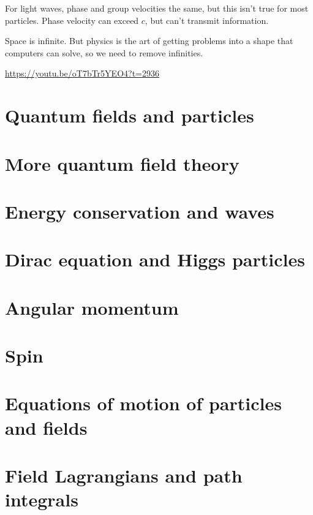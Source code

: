 \documentclass[]{article}
\begin{document}
For light waves, phase and group velocities the same, but this isn't true for most particles. Phase velocity can exceed $c$, but can't transmit information.

Space is infinite. But physics is the art of getting problems into a shape that computers can solve, so we need to remove infinities.

\url{https://youtu.be/oT7bTr5YEO4?t=2936}

\section{Quantum fields and particles}

\section{More quantum field theory}

\section{Energy conservation and waves}

\section{Dirac equation and Higgs particles}

\section{Angular momentum}

\section{Spin}

\section{Equations of motion of particles and fields}

\section{Field Lagrangians and path integrals}
\end{document}
